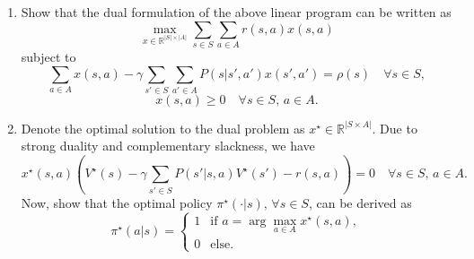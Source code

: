 \documentclass[a3paper,12pt]{extarticle} %
\begin{document}
\begin{enumerate}
    \item Show that the dual formulation of the above linear program can be written as
    \[
    \max_{x \in \mathbb{R}^{|S| \times |A|}} \sum_{s \in S} \sum_{a \in A} r(s, a)x(s, a)
    \]
    subject to
    \[
    \sum_{a \in A} x(s, a) - \gamma \sum_{s' \in S} \sum_{a' \in A} P(s|s', a')x(s', a') = \rho(s) \quad \forall s \in S,
    \]
    \[
    x(s, a) \geq 0 \quad \forall s \in S, \, a \in A.
    \]
   \item Denote the optimal solution to the dual problem as $x^\star \in \mathbb{R}^{|S \times A|}$. Due to strong duality
    and complementary slackness, we have
    \[
    x^\star(s, a) \left(V^\star(s) - \gamma \sum_{s' \in S} P(s'|s, a)V^\star(s') - r(s, a)\right) = 0 \quad \forall s \in S, \, a \in A.
    \]
    Now, show that the optimal policy $\pi^\star(\cdot|s), \, \forall s \in S$, can be derived as
    \[
    \pi^\star(a|s) =
    \begin{cases}
    1 & \text{if } a = \arg \max_{a \in A} x^\star(s, a), \\
    0 & \text{else}.
    \end{cases}
    \]
\end{enumerate}
\end{document}
